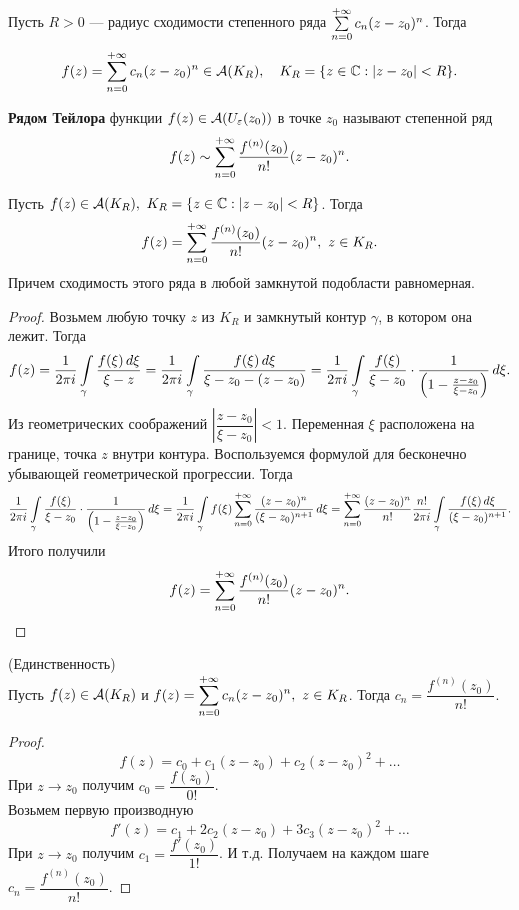 	\begin{remark}
		Пусть $R>0$ --- радиус сходимости степенного ряда $\sum\limits_{n=0}^{+\infty}c_n(z-z_0)^n$. Тогда
		\[ f(z) = \sum\limits_{n=0}^{+\infty}c_n(z-z_0)^n\in\mathcal{A}(K_R),\quad K_R = \{z\in\mathbb{C}: |z-z_0| < R\}. \]
	\end{remark}
	\begin{definition}
		\textbf{Рядом Тейлора} функции $f(z)\in\mathcal{A}(U_\varepsilon(z_0))$ в точке $z_0$ называют степенной ряд
		\[ f(z)\sim\sum\limits_{n=0}^{+\infty}\frac{f^{(n)}(z_0)}{n!}(z-z_0)^n. \]
	\end{definition}
	\begin{theorem}
		Пусть $f(z)\in\mathcal{A}(K_R),\ K_R = \{ z\in\mathbb{C}:|z-z_0|<R \}$. Тогда 
		\[ f(z) = \sum\limits_{n=0}^{+\infty}\frac{f^{(n)}(z_0)}{n!}(z-z_0)^n,\ z\in K_R. \]
		Причем сходимость этого ряда в любой замкнутой подобласти равномерная.
	\end{theorem}
	\begin{proof}
		Возьмем любую точку $z$ из $K_R$ и замкнутый контур $\gamma$, в котором она лежит. Тогда 
		\[ f(z) = \frac{1}{2\pi i}\int\limits_\gamma\frac{f(\xi)\,d\xi}{\xi-z} = \frac{1}{2\pi i}\int\limits_\gamma\frac{f(\xi)\,d\xi}{\xi-z_0-(z-z_0)} = \frac{1}{2\pi i}\int\limits_\gamma\frac{f(\xi)}{\xi-z_0}\cdot\frac{1}{\left(1 - \frac{z-z_0}{\xi-z_0} \right)}\,d\xi.  \]
		Из геометрических соображений $\left|\dfrac{z - z_0}{\xi - z_0}\right| < 1$. Переменная $\xi$ расположена на границе, точка $z$ внутри контура. Воспользуемся формулой для бесконечно убывающей геометрической прогрессии. Тогда 
		\[ \frac{1}{2\pi i}\int\limits_\gamma\frac{f(\xi)}{\xi-z_0}\cdot\frac{1}{\left(1 - \frac{z-z_0}{\xi-z_0} \right)}\,d\xi = \frac{1}{2\pi i}\int\limits_\gamma f(\xi)\sum\limits_{n=0}^{+\infty}\frac{(z-z_0)^n}{(\xi-z_0)^{n+1}} \,d\xi = \sum\limits_{n=0}^{+\infty}\frac{(z-z_0)^n}{n!} \frac{n!}{2\pi i}\int\limits_\gamma\frac{f(\xi)\,d\xi}{(\xi - z_0)^{n+1}}. \]
		Итого получили 
		\[ f(z) = \sum\limits_{n=0}^{+\infty}\frac{f^{(n)}(z_0)}{n!}(z-z_0)^n. \]
	\end{proof}
	\vspace{-\baselineskip}
	\begin{theorem*}
		(Единственность)\\ \indent
		Пусть $f(z)\in\mathcal{A}(K_R)$ и $f(z) = \displaystyle\sum\limits_{n=0}^{+\infty}c_n(z-z_0)^n,\ z\in K_R$. Тогда $c_n=\dfrac{f^{(n)}(z_0)}{n!}$.
	\end{theorem*}
	\begin{proof}
		\[ f(z) = c_0 + c_1(z-z_0) + c_2(z-z_0)^2 + \ldots \]
		При $z\to z_0$ получим $c_0 = \dfrac{f(z_0)}{0!}$.\\
		Возьмем первую производную
		\[ f'(z) = c_1 + 2c_2(z-z_0) + 3c_3(z-z_0)^2 + \ldots \]
		При $z\to z_0$ получим $c_1 = \dfrac{f'(z_0)}{1!}$. И т.д.
		Получаем на каждом шаге $c_n = \dfrac{f^{(n)}(z_0)}{n!}$.
	\end{proof}
	\newpage
